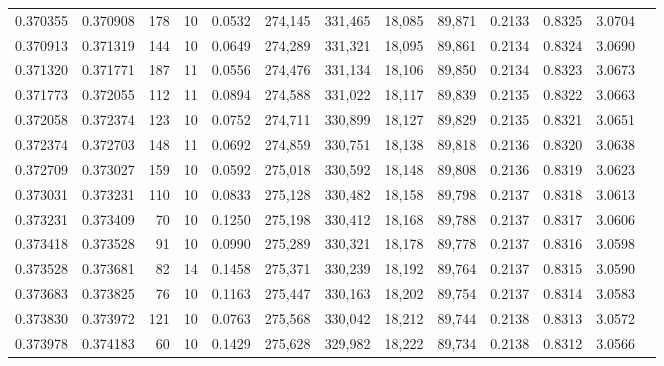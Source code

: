 \begin{tabular}{rrrrrrrrrrrrr}
0.370355 & 0.370908 &   178 &  10 &                                     0.0532 & 274,145 & 331,465 &  18,085 &  89,871 & 0.2133 & 0.8325 & 3.0704 \\
0.370913 & 0.371319 &   144 &  10 &                                     0.0649 & 274,289 & 331,321 &  18,095 &  89,861 & 0.2134 & 0.8324 & 3.0690 \\
0.371320 & 0.371771 &   187 &  11 &                                     0.0556 & 274,476 & 331,134 &  18,106 &  89,850 & 0.2134 & 0.8323 & 3.0673 \\
0.371773 & 0.372055 &   112 &  11 &                                     0.0894 & 274,588 & 331,022 &  18,117 &  89,839 & 0.2135 & 0.8322 & 3.0663 \\
0.372058 & 0.372374 &   123 &  10 &                                     0.0752 & 274,711 & 330,899 &  18,127 &  89,829 & 0.2135 & 0.8321 & 3.0651 \\
0.372374 & 0.372703 &   148 &  11 &                                     0.0692 & 274,859 & 330,751 &  18,138 &  89,818 & 0.2136 & 0.8320 & 3.0638 \\
0.372709 & 0.373027 &   159 &  10 &                                     0.0592 & 275,018 & 330,592 &  18,148 &  89,808 & 0.2136 & 0.8319 & 3.0623 \\
0.373031 & 0.373231 &   110 &  10 &                                     0.0833 & 275,128 & 330,482 &  18,158 &  89,798 & 0.2137 & 0.8318 & 3.0613 \\
0.373231 & 0.373409 &    70 &  10 &                                     0.1250 & 275,198 & 330,412 &  18,168 &  89,788 & 0.2137 & 0.8317 & 3.0606 \\
0.373418 & 0.373528 &    91 &  10 &                                     0.0990 & 275,289 & 330,321 &  18,178 &  89,778 & 0.2137 & 0.8316 & 3.0598 \\
0.373528 & 0.373681 &    82 &  14 &                                     0.1458 & 275,371 & 330,239 &  18,192 &  89,764 & 0.2137 & 0.8315 & 3.0590 \\
0.373683 & 0.373825 &    76 &  10 &                                     0.1163 & 275,447 & 330,163 &  18,202 &  89,754 & 0.2137 & 0.8314 & 3.0583 \\
0.373830 & 0.373972 &   121 &  10 &                                     0.0763 & 275,568 & 330,042 &  18,212 &  89,744 & 0.2138 & 0.8313 & 3.0572 \\
0.373978 & 0.374183 &    60 &  10 &                                     0.1429 & 275,628 & 329,982 &  18,222 &  89,734 & 0.2138 & 0.8312 & 3.0566 \\

\end{tabular}
